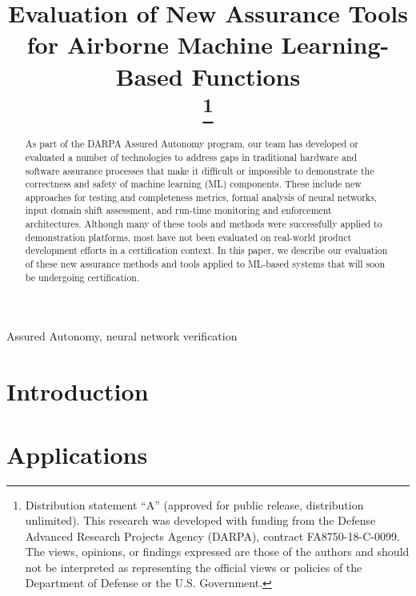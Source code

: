 \documentclass[conference]{IEEEtran}
\begin{document}
\title{Evaluation of New Assurance Tools for Airborne Machine Learning-Based Functions\\
\thanks{Distribution statement ``A'' (approved for public release, distribution unlimited). This research was developed with funding from the Defense Advanced Research Projects Agency (DARPA), contract FA8750-18-C-0099. The views, opinions, or findings expressed are those of the authors and should not be interpreted as representing the official views or policies of the Department of Defense or the U.S. Government.}
}

\author{
}

\maketitle

\begin{abstract}
As part of the DARPA Assured Autonomy program, our team has developed or evaluated a number of technologies to address gaps in traditional hardware and software assurance processes that make it difficult or impossible to demonstrate the correctness and safety of machine learning (ML) components.    These include new approaches for testing and completeness metrics, formal analysis of neural networks, input domain shift assessment, and run-time monitoring and enforcement architectures.  Although many of these tools and methods were successfully applied to demonstration platforms, most have not been evaluated on real-world product development efforts in a certification context.  In this paper, we describe our evaluation of these new assurance methods and tools applied to ML-based systems that will soon be undergoing certification.
\end{abstract}

\begin{IEEEkeywords}
Assured Autonomy, neural network verification
\end{IEEEkeywords}

\section{Introduction}
\label{sec:introduction}


\section{Applications}
\label{sec:applications}

\end{document}
